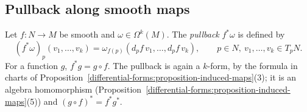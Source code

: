 \subsection{Pullback along smooth maps}\label{differential-forms:subsection-pullback}

\begin{definition}\label{differential-forms:definition-pullback}
Let $f \colon N \to M$ be smooth and $\omega \in \Omega^k(M)$. The \emph{pullback} $f^*\omega$ is defined by
\[
(f^*\omega)_p(v_1, \ldots, v_k) = \omega_{f(p)}(d_pf\,v_1, \ldots, d_pf\,v_k), \qquad p \in N,\ v_1, \ldots, v_k \in T_pN .
\]
For a function $g$, $f^*g = g \circ f$. The pullback is again a $k$-form, by the formula in charts of Proposition~\ref{differential-forms:proposition-induced-maps}(3); it is an algebra homomorphism
(Proposition~\ref{differential-forms:proposition-induced-maps}(5)) and $(g \circ f)^* = f^*g^*$.
\end{definition}

